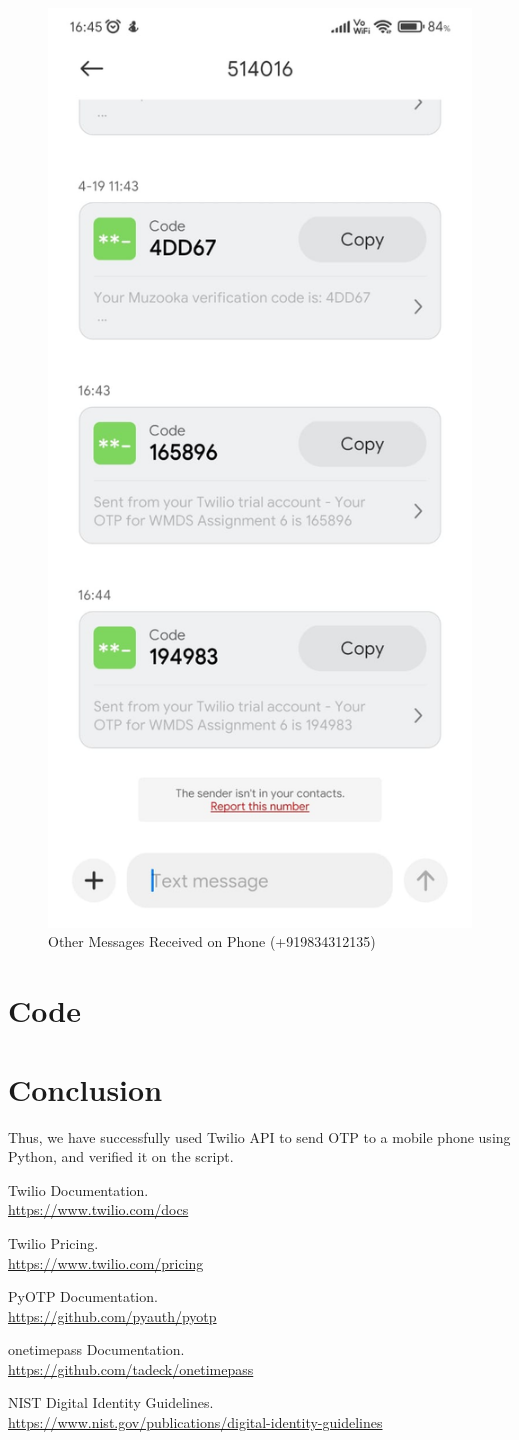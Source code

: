 \documentclass[11pt]{article}
\begin{document}
\begin{figure}[H]
    \centering
    \includegraphics[width=.45\textwidth]{./otps.jpeg}
    \caption{Other Messages Received on Phone (+919834312135)}
\end{figure}

\section{Code}


\section{Conclusion}
Thus, we have successfully used Twilio API to send OTP to a mobile phone using
Python, and verified it on the script. \clearpage

\begin{thebibliography}{99}
    Twilio Documentation. \\
    \url{https://www.twilio.com/docs}

    Twilio Pricing. \\
    \url{https://www.twilio.com/pricing}

    PyOTP Documentation. \\
    \url{https://github.com/pyauth/pyotp}

    onetimepass Documentation. \\
    \url{https://github.com/tadeck/onetimepass}

    NIST Digital Identity Guidelines. \\
    \url{https://www.nist.gov/publications/digital-identity-guidelines}
\end{thebibliography}
\end{document}
